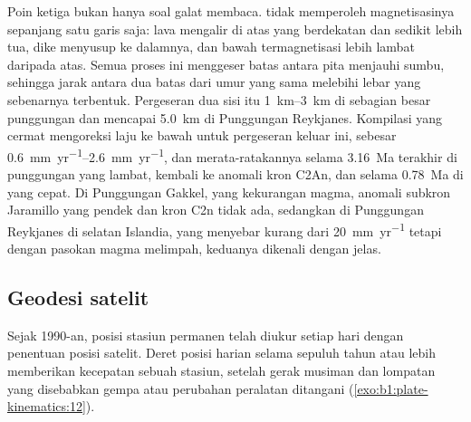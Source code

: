 Poin ketiga bukan hanya soal galat membaca.  tidak memperoleh magnetisasinya sepanjang satu garis saja: lava mengalir di atas  yang berdekatan dan sedikit lebih tua, dike menyusup ke dalamnya, dan  bawah termagnetisasi lebih lambat daripada  atas. Semua proses ini menggeser batas antara pita menjauhi sumbu, sehingga jarak antara dua batas dari umur yang sama melebihi lebar  yang sebenarnya terbentuk. Pergeseran dua sisi itu \qtyrange{1}{3}{km} di sebagian besar punggungan dan mencapai \qty{5.0}{km} di Punggungan Reykjanes. Kompilasi yang cermat mengoreksi laju ke bawah untuk pergeseran keluar ini, sebesar \qtyrange{0.6}{2.6}{mm.yr^{-1}}, dan merata-ratakannya selama \qty{3.16}{Ma} terakhir di punggungan yang lambat, kembali ke anomali kron C2An, dan selama \qty{0.78}{Ma} di yang cepat. Di Punggungan Gakkel, yang kekurangan magma, anomali subkron Jaramillo yang pendek dan kron C2n tidak ada, sedangkan di Punggungan Reykjanes di selatan Islandia, yang menyebar kurang dari \qty{20}{mm.yr^{-1}} tetapi dengan pasokan magma melimpah, keduanya dikenali dengan jelas.

\subsection*{Geodesi satelit}

Sejak 1990-an, posisi stasiun permanen telah diukur setiap hari dengan penentuan posisi satelit. Deret posisi harian selama sepuluh tahun atau lebih memberikan kecepatan sebuah stasiun, setelah gerak musiman dan lompatan yang disebabkan gempa atau perubahan peralatan ditangani (\cref{exo:b1:plate-kinematics:12}).

